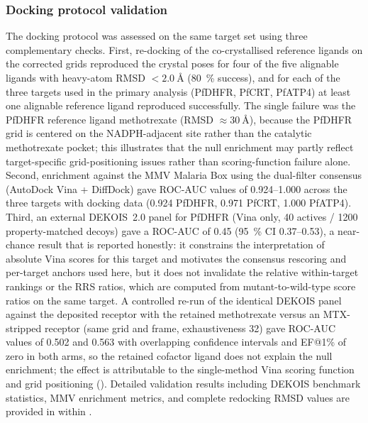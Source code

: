 \documentclass[journal=jcisd8,manuscript=article]{achemso}
\begin{document}
\subsubsection{Docking protocol validation}\label{sec:methods_dock_val}
The docking protocol was assessed on the same target set using three complementary checks. First, re-docking of the co-crystallised reference ligands on the corrected grids reproduced the crystal poses for four of the five alignable ligands with heavy-atom RMSD $< \SI{2.0}{\angstrom}$ (\qty{80}{\percent} success), and for each of the three targets used in the primary analysis (PfDHFR, PfCRT, PfATP4) at least one alignable reference ligand reproduced successfully. The single failure was the PfDHFR reference ligand methotrexate (RMSD $\approx \SI{30}{\angstrom}$), because the PfDHFR grid is centered on the NADPH-adjacent site rather than the catalytic methotrexate pocket; this illustrates that the null enrichment may partly reflect target-specific grid-positioning issues rather than scoring-function failure alone. Second, enrichment against the MMV Malaria Box using the dual-filter consensus (AutoDock Vina + DiffDock) gave ROC-AUC values of \numrange{0.924}{1.000} across the three targets with docking data (\num{0.924} PfDHFR, \num{0.971} PfCRT, \num{1.000} PfATP4). Third, an external DEKOIS~2.0 panel for PfDHFR (Vina only, \num{40} actives / \num{1200} property-matched decoys) gave a ROC-AUC of \num{0.45} (\qty{95}{\percent} CI \numrange{0.37}{0.53}), a near-chance result that is reported honestly: it constrains the interpretation of absolute Vina scores for this target and motivates the consensus rescoring and per-target anchors used here, but it does not invalidate the relative within-target rankings or the RRS ratios, which are computed from mutant-to-wild-type score ratios on the same target. A controlled re-run of the identical DEKOIS panel against the deposited receptor with the retained methotrexate versus an MTX-stripped receptor (same grid and frame, exhaustiveness 32) gave ROC-AUC values of \num{0.502} and \num{0.563} with overlapping confidence intervals and EF@1\% of zero in both arms, so the retained cofactor ligand does not explain the null enrichment; the effect is attributable to the single-method Vina scoring function and grid positioning (). Detailed validation results including DEKOIS benchmark statistics, MMV enrichment metrics, and complete redocking RMSD values are provided in  within .
\end{document}
